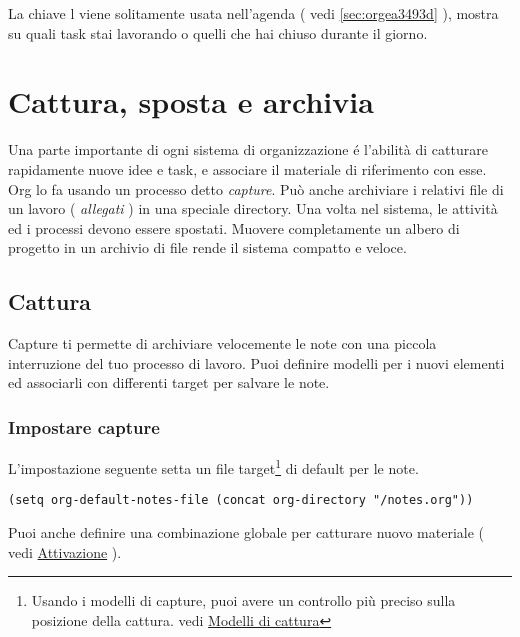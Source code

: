 \documentclass[11pt]{article}
\begin{document}
La chiave l viene solitamente usata nell'agenda ( vedi
\ref{sec:orgea3493d} ), mostra su quali task stai
lavorando o quelli che hai chiuso durante il giorno.

\section{Cattura, sposta e archivia}
\label{sec:org3779a59}
Una parte importante di ogni sistema di organizzazione é l'abilità di
catturare rapidamente nuove idee e task, e associare il materiale di
riferimento con esse. Org lo fa usando un processo detto
\emph{capture}. Può anche archiviare i relativi file di un lavoro (
\emph{allegati} ) in una speciale directory. Una volta nel sistema, le
attività ed i processi devono essere spostati. Muovere completamente
un albero di progetto in un archivio di file rende il sistema
compatto e veloce.

\subsection{Cattura}
\label{sec:orga54c03f}
Capture ti permette di archiviare velocemente le note con una piccola
interruzione del tuo processo di lavoro. Puoi definire modelli per i
nuovi elementi ed associarli con differenti target per salvare le
note.

\subsubsection*{Impostare capture}
\label{sec:org54acc29}
L'impostazione seguente setta un file target\footnote{Usando i modelli di capture, puoi avere un controllo più preciso
sulla posizione della cattura. vedi \hyperref[sec:orga0098a0]{Modelli di cattura}} di default per le
note.

\begin{verbatim}
(setq org-default-notes-file (concat org-directory "/notes.org"))
\end{verbatim}

Puoi anche definire una combinazione globale per catturare nuovo
materiale ( vedi \hyperref[sec:orgb24a1ce]{Attivazione} ).
\end{document}
